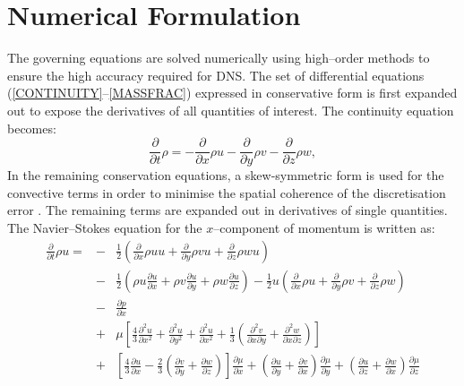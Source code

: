 \documentclass[dvips]{article}
\begin{document}
\section{Numerical Formulation}
The governing equations are solved numerically using high--order methods
to ensure the high accuracy required for DNS.  The set of differential
equations (\ref{CONTINUITY}--\ref{MASSFRAC}) expressed in conservative form is
first expanded out to expose the derivatives of all quantities of interest.
The continuity equation becomes: 
\begin{equation}
\frac{\partial}{\partial t}\rho =
-\frac{\partial}{\partial x}\rho u
-\frac{\partial}{\partial y}\rho v
-\frac{\partial}{\partial z}\rho w,
\label{EXCONTINUITY}
\end{equation}
In the remaining conservation equations, a skew-symmetric form is used
for the convective terms in order to minimise the spatial coherence of the
discretisation error \cite{SkewStanford}.  The remaining terms are
expanded out in derivatives of single quantities.  The Navier--Stokes
equation for the $x$--component of momentum is written as:
\begin{eqnarray}
\frac{\partial}{\partial t}\rho u =
& - & \frac{1}{2}\left(
 \frac{\partial}{\partial x}\rho u u 
+\frac{\partial}{\partial y}\rho v u 
+\frac{\partial}{\partial z}\rho w u
                 \right) \nonumber\\
& - & \frac{1}{2}\left(
 \rho u\frac{\partial u}{\partial x}
+\rho v\frac{\partial u}{\partial y}
+\rho w\frac{\partial u}{\partial z}
                 \right)
-\frac{1}{2}u\left(
 \frac{\partial}{\partial x}\rho u
+\frac{\partial}{\partial y}\rho v
+\frac{\partial}{\partial z}\rho w
             \right) \nonumber\\
& - & \frac{\partial p}{\partial x} \nonumber\\
& + & \mu\left[
\frac{4}{3}\frac{\partial^{2}u}{\partial x^{2}}
          +\frac{\partial^{2}u}{\partial y^{2}}
          +\frac{\partial^{2}u}{\partial x^{2}}
+\frac{1}{3}\left(
 \frac{\partial^{2}v}{\partial x\partial y}
+\frac{\partial^{2}w}{\partial x\partial z}
            \right)
\right]\nonumber\\
& + & \left[
\frac{4}{3}\frac{\partial u}{\partial x}
-\frac{2}{3}\left(
 \frac{\partial v}{\partial y}
+\frac{\partial w}{\partial z}
            \right)
      \right]\frac{\partial \mu}{\partial x}
+\left(
 \frac{\partial u}{\partial y}
+\frac{\partial v}{\partial x}
 \right)\frac{\partial \mu}{\partial y}
+\left(
 \frac{\partial u}{\partial z}
+\frac{\partial w}{\partial x}
 \right)\frac{\partial \mu}{\partial z}
\label{EXMOMENTUM}
\end{eqnarray}
\end{document}
